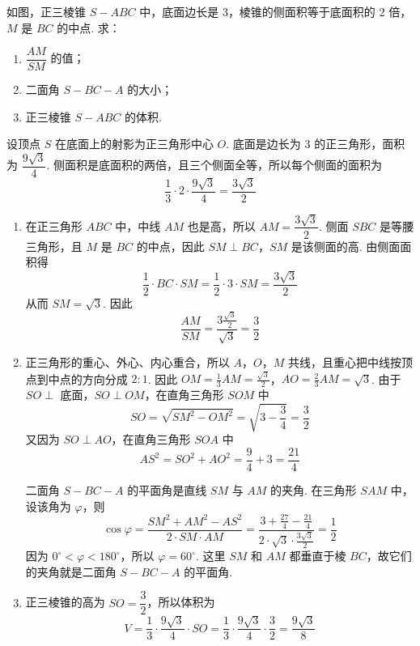 \begin{problem}
如图，正三棱锥 \(S-ABC\) 中，底面边长是 \(3\)，棱锥的侧面积等于底面积的 \(2\) 倍，\(M\) 是 \(BC\) 的中点. 求：

\begin{enumerate}
\item \(\dfrac{AM}{SM}\) 的值；
\item 二面角 \(S-BC-A\) 的大小；
\item 正三棱锥 \(S-ABC\) 的体积.
\end{enumerate}

\begin{center}
\end{center}
\end{problem}

\begin{solution}
设顶点 \(S\) 在底面上的射影为正三角形中心 \(O\). 底面是边长为 \(3\) 的正三角形，面积为 \(\dfrac{9\sqrt3}{4}\). 侧面积是底面积的两倍，且三个侧面全等，所以每个侧面的面积为
\[
\frac13\cdot2\cdot\frac{9\sqrt3}{4}=\frac{3\sqrt3}{2}
\]

\begin{enumerate}
\item 在正三角形 \(ABC\) 中，中线 \(AM\) 也是高，所以 \(AM=\dfrac{3\sqrt3}{2}\). 侧面 \(SBC\) 是等腰三角形，且 \(M\) 是 \(BC\) 的中点，因此 \(SM\perp BC\)，\(SM\) 是该侧面的高. 由侧面面积得
\[
\frac12\cdot BC\cdot SM=\frac12\cdot3\cdot SM=\frac{3\sqrt3}{2}
\]
从而 \(SM=\sqrt3\). 因此
\[
\frac{AM}{SM}=\frac{3\frac{\sqrt3}{2}}{\sqrt3}=\frac32
\]
\item 正三角形的重心、外心、内心重合，所以 \(A\)，\(O\)，\(M\) 共线，且重心把中线按顶点到中点的方向分成 \(2:1\). 因此
\(OM=\frac13AM=\frac{\sqrt3}{2}\)，\(AO=\frac23AM=\sqrt3\).
由于 \(SO\perp\) 底面，\(SO\perp OM\)，在直角三角形 \(SOM\) 中
\[
SO=\sqrt{SM^2-OM^2}=\sqrt{3-\frac34}=\frac32
\]
又因为 \(SO\perp AO\)，在直角三角形 \(SOA\) 中
\[
AS^2=SO^2+AO^2=\frac94+3=\frac{21}{4}
\]

二面角 \(S-BC-A\) 的平面角是直线 \(SM\) 与 \(AM\) 的夹角. 在三角形 \(SAM\) 中，设该角为 \(\varphi\)，则
\[
\cos\varphi=\frac{SM^2+AM^2-AS^2}{2\cdot SM\cdot AM}=\frac{3+\frac{27}{4}-\frac{21}{4}}{2\cdot\sqrt3\cdot\frac{3\sqrt3}{2}}=\frac12
\]
因为 \(0^\circ<\varphi<180^\circ\)，所以 \(\varphi=60^\circ\). 这里 \(SM\) 和 \(AM\) 都垂直于棱 \(BC\)，故它们的夹角就是二面角 \(S-BC-A\) 的平面角.
\item 正三棱锥的高为 \(SO=\dfrac32\)，所以体积为
\[
V=\frac13\cdot\frac{9\sqrt3}{4}\cdot SO=\frac13\cdot\frac{9\sqrt3}{4}\cdot\frac32=\frac{9\sqrt3}{8}
\]
\end{enumerate}
\end{solution}

